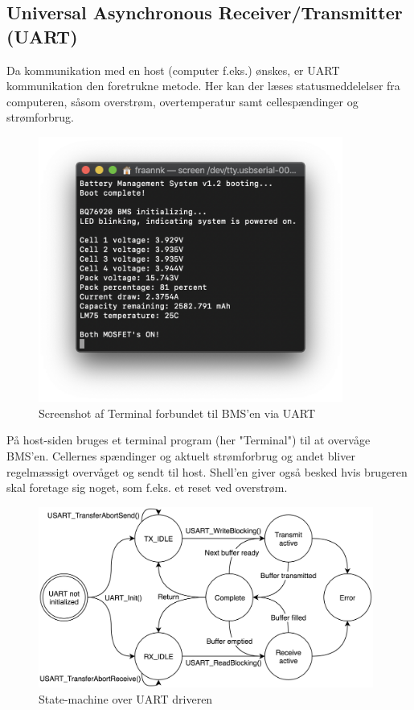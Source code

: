 \subsection{Universal Asynchronous Receiver/Transmitter (UART)}
Da kommunikation med en host (computer f.eks.) ønskes, er UART kommunikation den foretrukne metode. Her kan der læses statusmeddelelser fra computeren, såsom overstrøm, overtemperatur samt cellespændinger og strømforbrug.

\begin{figure}[h]
	\centering
	\includegraphics[width=10cm]{billeder/shell_screen.png}
	\caption{Screenshot af Terminal forbundet til BMS'en via UART}
	\label{fig:I2C_sm}
\end{figure}

På host-siden bruges et terminal program (her "Terminal") til at overvåge BMS'en. Cellernes spændinger og aktuelt strømforbrug og andet bliver regelmæssigt overvåget og sendt til host. Shell'en giver også besked hvis brugeren skal foretage sig noget, som f.eks. et reset ved overstrøm.

\begin{figure}[h]
	\centering
	\includegraphics[width=11cm]{billeder/UART_sm.png}
	\caption{State-machine over UART driveren}
	\label{fig:UART_sm}
\end{figure}


